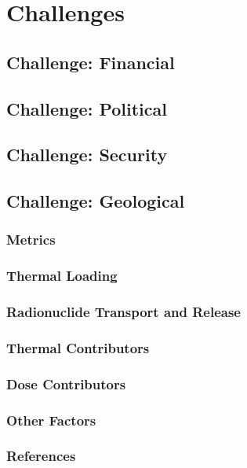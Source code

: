 \documentclass[9pt]{beamer}
\begin{document}
\section{Challenges}
\subsection{Challenge: Financial}

\subsection{Challenge: Political}

\subsection{Challenge: Security}

\subsection{Challenge: Geological}
\subsubsection{Metrics}

\subsubsection{Thermal Loading}

\subsubsection{Radionuclide Transport and Release}

\subsubsection{Thermal Contributors}

\subsubsection{Dose Contributors}

\subsubsection{Other Factors}


\begin{frame}[allowframebreaks]
  \frametitle{References}
  
  {\footnotesize  }

\end{frame}

\end{document}

